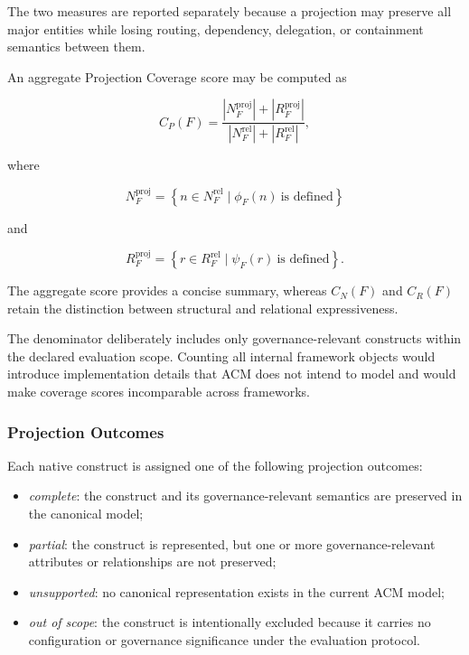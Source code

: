 \documentclass[10pt]{article}
\begin{document}
The two measures are reported separately because a projection may preserve all
major entities while losing routing, dependency, delegation, or containment
semantics between them.

An aggregate Projection Coverage score may be computed as

\begin{equation}
C_P(F)
=
\frac{
	|N_F^{\mathrm{proj}}|
	+
	|R_F^{\mathrm{proj}}|
}{
	|N_F^{\mathrm{rel}}|
	+
	|R_F^{\mathrm{rel}}|
},
\end{equation}

where

\begin{equation}
N_F^{\mathrm{proj}}
=
\left\{
n\in N_F^{\mathrm{rel}}
\mid
\phi_F(n)\ \text{is defined}
\right\}
\end{equation}

and

\begin{equation}
R_F^{\mathrm{proj}}
=
\left\{
r\in R_F^{\mathrm{rel}}
\mid
\psi_F(r)\ \text{is defined}
\right\}.
\end{equation}

The aggregate score provides a concise summary, whereas $C_N(F)$ and $C_R(F)$
retain the distinction between structural and relational expressiveness.

The denominator deliberately includes only governance-relevant constructs
within the declared evaluation scope. Counting all internal framework objects
would introduce implementation details that ACM does not intend to model and
would make coverage scores incomparable across frameworks.

\subsubsection{Projection Outcomes}

Each native construct is assigned one of the following projection outcomes:

\begin{itemize}
	\item \emph{complete}: the construct and its governance-relevant semantics
	are preserved in the canonical model;
	\item \emph{partial}: the construct is represented, but one or more
	governance-relevant attributes or relationships are not preserved;
	\item \emph{unsupported}: no canonical representation exists in the current
	ACM model;
	\item \emph{out of scope}: the construct is intentionally excluded because
	it carries no configuration or governance significance under the evaluation
	protocol.
\end{itemize}
\end{document}
